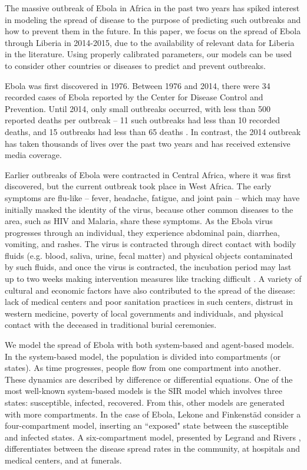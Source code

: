 The massive outbreak of Ebola in Africa in the past two years has spiked interest in modeling the spread of disease to the purpose of predicting such outbreaks and how to prevent them in the future. In this paper, we focus on the spread of Ebola through Liberia in 2014-2015, due to the availability of relevant data for Liberia in the literature. Using properly calibrated parameters, our models can be used to consider other countries or diseases to predict and prevent outbreaks.

Ebola was first discovered in 1976. Between 1976 and 2014, there were 34 recorded cases of Ebola reported by the Center for Disease Control and Prevention. Until 2014, only small outbreaks occurred, with less than 500 reported deaths per outbreak -- 11 such outbreaks had less than 10 recorded deaths, and 15 outbreaks had less than 65 deaths \cite{CDCOutbreaks}. In contrast, the 2014 outbreak has taken thousands of lives over the past two years and has received extensive media coverage.

Earlier outbreaks of Ebola were contracted in Central Africa, where it was first discovered, but the current outbreak took place in West Africa. The early symptoms are flu-like -- fever, headache, fatigue, and joint pain -- which may have initially masked the identity of the virus, because other common diseases to the area, such as HIV and Malaria, share these symptoms. As the Ebola virus progresses through an individual, they experience abdominal pain, diarrhea, vomiting, and rashes. The virus is contracted through direct contact with bodily fluids (e.g. blood, saliva, urine, fecal matter) and physical objects contaminated by such fluids, and once the virus is contracted, the incubation period may last up to two weeks making intervention measures like tracking difficult \cite{CDCSympt}. A variety of cultural and economic factors have also contributed to the spread of the disease: lack of medical centers and poor sanitation practices in such centers, distrust in western medicine, poverty of local governments and individuals, and physical contact with the deceased in traditional burial ceremonies\cite{WHOReasons}.

We model the spread of Ebola with both system-based and agent-based models. In the system-based model, the population is divided into compartments (or states). As time progresses, people flow from one compartment into another. These dynamics are described by difference or differential equations. One of the most well-known system-based models is the SIR model which involves three states: susceptible, infected, recovered. From this, other models are generated with more compartments. In the case of Ebola, Lekone and Finkenstäd \cite{Lekone2006} consider a four-compartment model, inserting an ``exposed" state between the susceptible and infected states. A six-compartment model, presented by Legrand \cite{Legrand2007} and Rivers \cite{Rivers2014}, differentiates between the disease spread rates in the community, at hospitals and medical centers, and at funerals.

